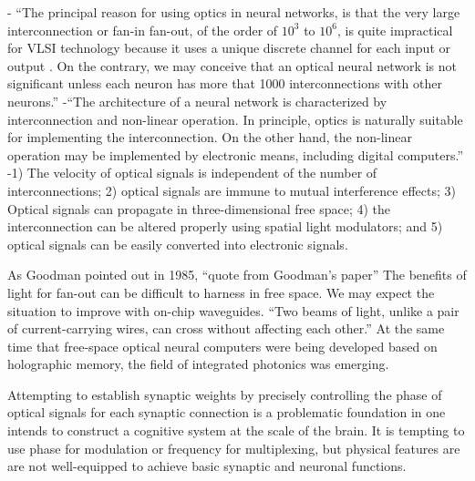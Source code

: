 \vspace{3em}
-\cite{juya1996} ``The principal reason for using optics in neural networks, is that the very large interconnection or fan-in fan-out, of the order of $10^3$ to $10^6$, is quite impractical for VLSI technology because it uses a unique discrete channel for each input or output \cite{caki1989}. On the contrary, we may conceive that an optical neural network is not significant unless each neuron has more that 1000 interconnections with other neurons.''
-``The architecture of a neural network is characterized by interconnection and non-linear operation. In principle, optics is naturally suitable for implementing the interconnection. On the other hand, the non-linear operation may be implemented by electronic means, including digital computers.'' \cite{juya1996}
-1) The velocity of optical signals is independent of the number of interconnections; 2) optical signals are immune to mutual interference effects; 3) Optical signals can propagate in three-dimensional free space; 4) the interconnection can be altered properly using spatial light modulators; and 5) optical signals can be easily converted into electronic signals. \cite{juya1996}

\vspace{3em}
As Goodman pointed out in 1985, ``quote from Goodman's paper'' The benefits of light for fan-out can be difficult to harness in free space. We may expect the situation to improve with on-chip waveguides. ``Two beams of light, unlike a pair of current-carrying wires, can cross without affecting each other.'' \cite{abps1987} At the same time that free-space optical neural computers were being developed based on holographic memory, the field of integrated photonics was emerging.

\vspace{3em}
Attempting to establish synaptic weights by precisely controlling the phase of optical signals for each synaptic connection is a problematic foundation in one intends to construct a cognitive system at the scale of the brain. It is tempting to use phase for modulation or frequency for multiplexing, but physical features are are not well-equipped to achieve basic synaptic and neuronal functions.

